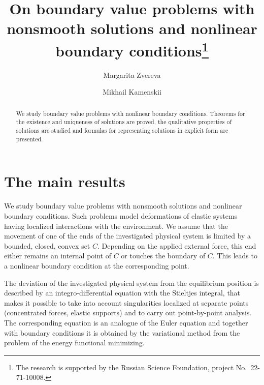 \documentclass[12pt]{llncs}
\begin{document}
\fi

\title{On boundary value problems with nonsmooth solutions and nonlinear boundary conditions\thanks{The research is supported by the Russian Science Foundation, project No.~22-71-10008.}}


\author{Margarita Zvereva \and  Mikhail Kamenskii
 }

\maketitle

\begin{abstract}

We study boundary value problems with  nonlinear boundary conditions. Theorems for the existence and uniqueness of solutions are proved, the qualitative properties of solutions are studied and formulas for representing solutions in explicit form are presented.



\end{abstract}


\section{The main results} %

We study  boundary value problems with nonsmooth solutions and nonlinear boundary conditions. Such problems model
 deformations  of elastic systems having localized interactions
with the environment. We assume that  the movement of one  of  the ends of the investigated physical system  is limited by  a bounded, closed, convex set $C$.  Depending on the applied external force,  this   end
either remains an internal point of $C$ or touches the boundary of
$C$. This leads to a nonlinear boundary condition at the
corresponding point.

The deviation of the investigated physical system  from the equilibrium position is described by an integro-differential equation with the Stieltjes integral, that makes it possible to take into account singularities localized at separate  points (concentrated forces, elastic supports) and to carry out point-by-point analysis. 
 The corresponding equation is an analogue of the Euler equation and together with boundary conditions it is obtained by the variational method from the problem of the energy functional minimizing.
 
\end{document}
